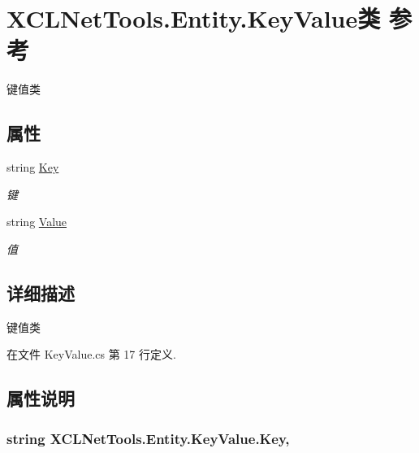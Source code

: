 \hypertarget{class_x_c_l_net_tools_1_1_entity_1_1_key_value}{}\section{X\+C\+L\+Net\+Tools.\+Entity.\+Key\+Value类 参考}
\label{class_x_c_l_net_tools_1_1_entity_1_1_key_value}


键值类  


\subsection*{属性}
\begin{DoxyCompactItemize}
\item 
string \hyperlink{class_x_c_l_net_tools_1_1_entity_1_1_key_value_a33e2f7bfdcc6a1dce560304a4450cf08}{Key}
\begin{DoxyCompactList}\small\item\em 键 \end{DoxyCompactList}\item 
string \hyperlink{class_x_c_l_net_tools_1_1_entity_1_1_key_value_a9ec3c76143930f64c1e0de2074514bae}{Value}
\begin{DoxyCompactList}\small\item\em 值 \end{DoxyCompactList}\end{DoxyCompactItemize}


\subsection{详细描述}
键值类 



在文件 Key\+Value.\+cs 第 17 行定义.



\subsection{属性说明}
\subsubsection[{\texorpdfstring{Key}{Key}}]{\setlength{\rightskip}{0pt plus 5cm}string X\+C\+L\+Net\+Tools.\+Entity.\+Key\+Value.\+Key\hspace{0.3cm}{\ttfamily [get]}, {\ttfamily [set]}}\hypertarget{class_x_c_l_net_tools_1_1_entity_1_1_key_value_a33e2f7bfdcc6a1dce560304a4450cf08}{}\label{class_x_c_l_net_tools_1_1_entity_1_1_key_value_a33e2f7bfdcc6a1dce560304a4450cf08}


